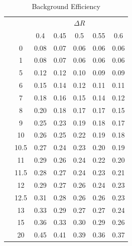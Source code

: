 \begin{table}[!htb]
	\centering
	\label{tab:iso-scan-bg-efficiency}
		\caption{Background Efficiency}
			\begin{tabular}{cc|ccccc}
    			&\multicolumn{1}{c}{} & \multicolumn{5}{c}{$\Delta R$} \\
    && 0.4 & 0.45 & 0.5 & 0.55 & 0.6 \\
    \cline{2-7}
& 0 & 0.08 & 0.07 & 0.06 & 0.06 & 0.06 \\ 
& 1 & 0.08 & 0.07 & 0.06 & 0.06 & 0.06 \\ 
& 5 & 0.12 & 0.12 & 0.10 & 0.09 & 0.09 \\ 
& 6 & 0.15 & 0.14 & 0.12 & 0.11 & 0.11 \\ 
& 7 & 0.18 & 0.16 & 0.15 & 0.14 & 0.12 \\ 
& 8 & 0.20 & 0.18 & 0.17 & 0.17 & 0.15 \\ 
\smash{\rotatebox[origin=c]{90}{\pt}} & 9 & 0.25 & 0.23 & 0.19 & 0.18 & 0.17 \\ 
& 10 & 0.26 & 0.25 & 0.22 & 0.19 & 0.18 \\ 
& 10.5 & 0.27 & 0.24 & 0.23 & 0.20 & 0.19 \\ 
& 11 & 0.29 & 0.26 & 0.24 & 0.22 & 0.20 \\ 
& 11.5 & 0.28 & 0.27 & 0.24 & 0.23 & 0.21 \\ 
& 12 & 0.29 & 0.27 & 0.26 & 0.24 & 0.23 \\ 
& 12.5 & 0.31 & 0.28 & 0.26 & 0.26 & 0.23 \\ 
& 13 & 0.33 & 0.29 & 0.27 & 0.27 & 0.24 \\ 
& 15 & 0.36 & 0.33 & 0.30 & 0.29 & 0.26 \\ 
& 20 & 0.45 & 0.41 & 0.39 & 0.36 & 0.37 \\ 
  \end{tabular}
\end{table}

